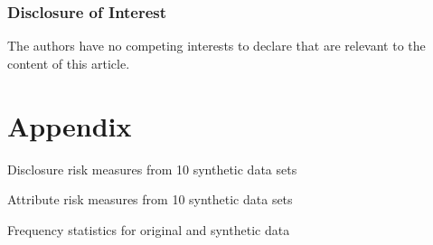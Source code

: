 \documentclass[runningheads]{llncs}
\begin{document}
\subsubsection{Disclosure of Interest} The authors have no competing interests to declare that are relevant to the content of this article.




\clearpage
\appendix
\section{Appendix}\label{appendix}
\setcounter{figure}{0}    
\setcounter{table}{0}    
\renewcommand*\thetable{\Alph{section}.\arabic{table}}
\renewcommand*\thefigure{\Alph{section}.\arabic{figure}}
\renewcommand{\theHfigure}{\Alph{section}.\arabic{table}}
\renewcommand{\theHtable}{\Alph{section}.\arabic{figure}}

\begin{table}[]
    \centering
    \caption{Disclosure risk measures from 10 synthetic data sets}
    
    \label{table:disclosure_risk_10}
\end{table}


\begin{table}[h!]
    \centering
    \caption{Attribute risk measures from 10 synthetic data sets}
    
    \label{table:attribute_risk_10}
\end{table}

\begin{table}[]
    \centering
    \caption{Frequency statistics for original and synthetic data}
    
    \label{table:frequency_10_data_sets}
\end{table}
\end{document}
